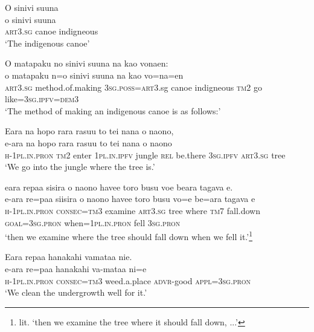 \ea\label{ex:text16-1}
O sinivi suuna\\
\gll o	sinivi	suuna\\
     \textsc{art}3.\textsc{sg}	canoe	indigneous\\
\glt `The indigenous canoe'
\z

\ea\label{ex:text16-2}
O matapaku no sinivi suuna na kao vonaen:\\
\gll o	matapaku	n=o	sinivi	suuna	na	kao	vo=na=en\\
     \textsc{art}3.\textsc{sg}	method.of.making	3\textsc{sg}.\textsc{poss}=\textsc{art}3.sg	canoe	indigneous	\textsc{tm}2	go	like=3\textsc{sg}.\textsc{ipfv}=\textsc{dem}3\\
\glt `The method of making an indigenous canoe is as follows:'
\z

\ea\label{ex:text16-3}
Eara na hopo rara rasuu to tei nana o naono,\\
\gll e-ara	na	hopo	rara	rasuu	to	tei	nana	o	naono\\
     \textsc{h}-1\textsc{pl}.\textsc{in}.\textsc{pron}	\textsc{tm}2	enter	1\textsc{pl}.\textsc{in}.\textsc{ipfv}	jungle	\textsc{rel}	be.there	3\textsc{sg}.\textsc{ipfv}	\textsc{art}3.\textsc{sg}	tree\\
\glt `We go into the jungle where the tree is.'
\z

\ea\label{ex:text16-4}
eara repaa sisira o naono havee toro busu voe beara tagava e.\\
\gll e-ara	re=paa	siisira	o	naono	havee	toro	busu	vo=e	be=ara	tagava	e\\
     \textsc{h}-1\textsc{pl}.\textsc{in}.\textsc{pron}	\textsc{consec}=\textsc{tm}3	examine	\textsc{art}3.\textsc{sg}	tree	where	\textsc{tm}7	fall.down	\textsc{goal}=3\textsc{sg}.\textsc{pron}	when=1\textsc{pl}.\textsc{in}.\textsc{pron}	fell	3\textsc{sg}.\textsc{pron}\\
\glt `then we examine where the tree should fall down when we fell it.'\footnote{lit. `then we examine the tree where it should fall down, ...'}
\z

\ea\label{ex:text16-5}
Eara repaa hanakahi vamataa nie.\\
\gll e-ara	re=paa	hanakahi	va-mataa	ni=e\\
     \textsc{h}-1\textsc{pl}.\textsc{in}.\textsc{pron}	\textsc{consec}=\textsc{tm}3	weed.a.place	\textsc{advr}-good	\textsc{appl}=3\textsc{sg}.\textsc{pron}\\
\glt `We clean the undergrowth well for it.'
\z

